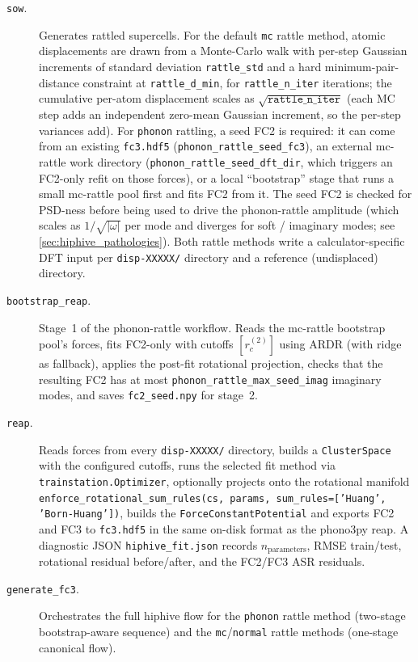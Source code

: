\begin{description}
  \item[\texttt{sow}.]  Generates rattled supercells.  For the default
        \texttt{mc} rattle method, atomic displacements are drawn from
        a Monte-Carlo walk with per-step Gaussian increments of standard
        deviation \texttt{rattle\_std} and a hard
        minimum-pair-distance constraint at \texttt{rattle\_d\_min},
        for \texttt{rattle\_n\_iter} iterations; the cumulative
        per-atom displacement scales as $\sqrt{\texttt{rattle\_n\_iter}}$
        (each MC step adds an independent zero-mean Gaussian increment,
        so the per-step variances add).  For
        \texttt{phonon} rattling, a seed FC2 is required: it can come
        from an existing \texttt{fc3.hdf5}
        (\texttt{phonon\_rattle\_seed\_fc3}), an external mc-rattle work
        directory (\texttt{phonon\_rattle\_seed\_dft\_dir}, which
        triggers an FC2-only refit on those forces), or a local
        ``bootstrap'' stage that runs a small mc-rattle pool first and
        fits FC2 from it.  The seed FC2 is checked for PSD-ness before
        being used to drive the phonon-rattle amplitude (which scales as
        $1/\sqrt{|\omega|}$ per mode and diverges for soft / imaginary
        modes; see \cref{sec:hiphive_pathologies}).  Both rattle
        methods write a calculator-specific DFT input per
        \texttt{disp-XXXXX/} directory and a reference (undisplaced)
        directory.

  \item[\texttt{bootstrap\_reap}.]  Stage~1 of the phonon-rattle
        workflow.  Reads the mc-rattle bootstrap pool's forces, fits
        FC2-only with cutoffs $[r_c^{(2)}]$ using ARDR (with ridge as
        fallback), applies the post-fit rotational projection, checks
        that the resulting FC2 has at most
        \texttt{phonon\_rattle\_max\_seed\_imag} imaginary modes, and
        saves \texttt{fc2\_seed.npy} for stage~2.

  \item[\texttt{reap}.]  Reads forces from every \texttt{disp-XXXXX/}
        directory, builds a \texttt{ClusterSpace} with the configured
        cutoffs, runs the selected fit method via
        \texttt{trainstation.Optimizer}, optionally projects onto the
        rotational manifold
        \texttt{enforce\_rotational\_sum\_rules(cs, params,
        sum\_rules=['Huang', 'Born-Huang'])}, builds the
        \texttt{ForceConstantPotential} and exports FC2 and FC3 to
        \texttt{fc3.hdf5} in the same on-disk format as the phono3py
        reap.  A diagnostic JSON \texttt{hiphive\_fit.json} records
        $n_\mathrm{parameters}$, RMSE train/test, rotational residual
        before/after, and the FC2/FC3 ASR residuals.

  \item[\texttt{generate\_fc3}.]  Orchestrates the full hiphive flow
        for the \texttt{phonon} rattle method (two-stage
        bootstrap-aware sequence) and the \texttt{mc}/\texttt{normal}
        rattle methods (one-stage canonical flow).
\end{description}

